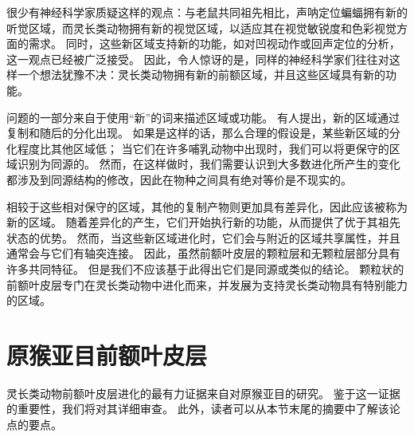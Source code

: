 很少有神经科学家质疑这样的观点：与老鼠共同祖先相比，声呐定位蝙蝠拥有新的听觉区域，而灵长类动物拥有新的视觉区域，以适应其在视觉敏锐度和色彩视觉方面的需求。
同时，这些新区域支持新的功能，如对凹视动作或回声定位的分析，这一观点已经被广泛接受。
因此，令人惊讶的是，同样的神经科学家们往往对这样一个想法犹豫不决：灵长类动物拥有新的前额区域，并且这些区域具有新的功能。


问题的一部分来自于使用“新”的词来描述区域或功能。
有人提出，新的区域通过复制和随后的分化出现\cite{krubitzer2000arealization}。
如果是这样的话，那么合理的假设是，某些新区域的分化程度比其他区域低；
当它们在许多哺乳动物中出现时，我们可以将更保守的区域识别为同源的。
然而，在这样做时，我们需要认识到大多数进化所产生的变化都涉及到同源结构的修改，因此在物种之间具有绝对等价是不现实的。


相较于这些相对保守的区域，其他的复制产物则更加具有差异化，因此应该被称为新的区域。
随着差异化的产生，它们开始执行新的功能，从而提供了优于其祖先状态的优势。
然而，当这些新区域进化时，它们会与附近的区域共享属性，并且通常会与它们有轴突连接。
因此，虽然前额叶皮层的颗粒层和无颗粒层部分具有许多共同特征。
但是我们不应该基于此得出它们是同源或类似的结论。
颗粒状的前额叶皮层专门在灵长类动物中进化而来，并发展为支持灵长类动物具有特别能力的区域。


\section{原猴亚目前额叶皮层}
灵长类动物前额叶皮层进化的最有力证据来自对原猴亚目的研究。
鉴于这一证据的重要性，我们将对其详细审查。
此外，读者可以从本节末尾的摘要中了解该论点的要点。

